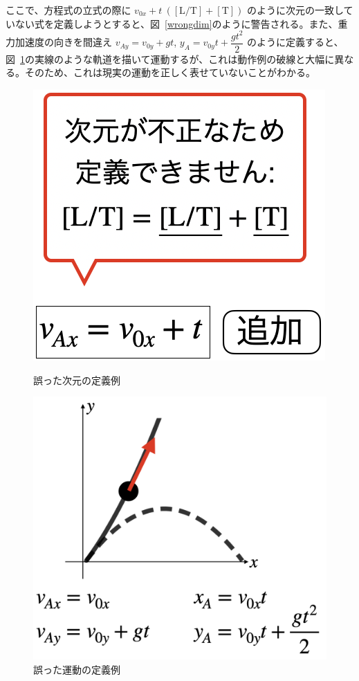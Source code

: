 ここで、方程式の立式の際に $v_{0x} + t ~\mathrm{([L/T] + [T])}$ のように次元の一致していない式を定義しようとすると、図~\ref{wrongdim}のように警告される。また、重力加速度の向きを間違え $v_{Ay} = v_{0y} + gt$, $y_A = v_{0y}t + \dfrac{gt^2}{2}$ のように定義すると、図~\ref{wrongmove}の実線のような軌道を描いて運動するが、これは動作例の破線と大幅に異なる。そのため、これは現実の運動を正しく表せていないことがわかる。

\begin{figure}[htb]
\centering
\begin{minipage}{0.35\linewidth}
\includegraphics*[width=\linewidth]{work/slide_wrongdim.png}
\caption{誤った次元の定義例} \label{wrongdim}
\end{minipage}
\quad
\begin{minipage}{0.5\linewidth}
\includegraphics*[width=\linewidth]{work/slide_wrongmove.png}
\caption{誤った運動の定義例} \label{wrongmove}
\end{minipage}
\end{figure}

